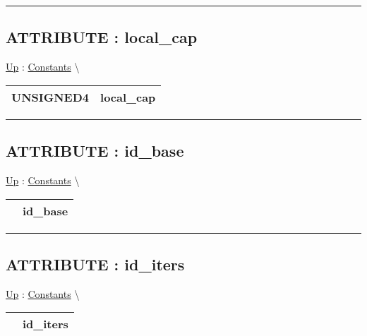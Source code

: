 \par


\rule{\linewidth}{0.5pt}
\subsection*{ATTRIBUTE : local\_cap}
\hypertarget{ecldoc:logisticregression.constants.local_cap}{}
\hyperlink{ecldoc:LogisticRegression.Constants}{Up} :
\hspace{0pt} \hyperlink{ecldoc:LogisticRegression.Constants}{Constants} \textbackslash 

{\renewcommand{\arraystretch}{1.5}
\begin{tabularx}{\textwidth}{|>{\raggedright\arraybackslash}l|X|}
\hline
\hspace{0pt}UNSIGNED4 & local\_cap \\
\hline
\end{tabularx}
}

\par


\rule{\linewidth}{0.5pt}
\subsection*{ATTRIBUTE : id\_base}
\hypertarget{ecldoc:logisticregression.constants.id_base}{}
\hyperlink{ecldoc:LogisticRegression.Constants}{Up} :
\hspace{0pt} \hyperlink{ecldoc:LogisticRegression.Constants}{Constants} \textbackslash 

{\renewcommand{\arraystretch}{1.5}
\begin{tabularx}{\textwidth}{|>{\raggedright\arraybackslash}l|X|}
\hline
\hspace{0pt} & id\_base \\
\hline
\end{tabularx}
}

\par


\rule{\linewidth}{0.5pt}
\subsection*{ATTRIBUTE : id\_iters}
\hypertarget{ecldoc:logisticregression.constants.id_iters}{}
\hyperlink{ecldoc:LogisticRegression.Constants}{Up} :
\hspace{0pt} \hyperlink{ecldoc:LogisticRegression.Constants}{Constants} \textbackslash 

{\renewcommand{\arraystretch}{1.5}
\begin{tabularx}{\textwidth}{|>{\raggedright\arraybackslash}l|X|}
\hline
\hspace{0pt} & id\_iters \\
\hline
\end{tabularx}
}

